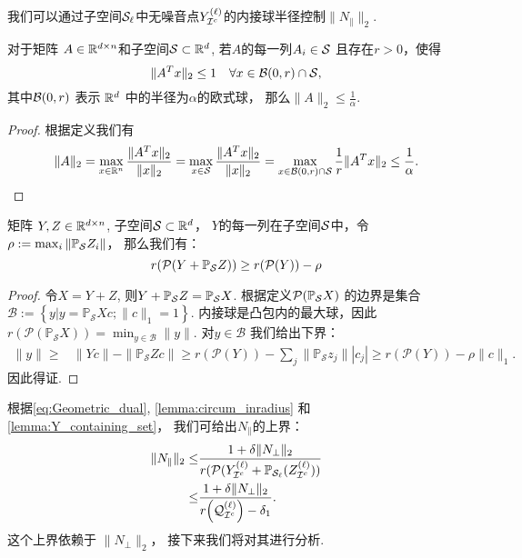 我们可以通过子空间\(\mathcal{S}_\ell\)中无噪音点\(Y^{(\ell)}_{\mathcal{I}^c}\)的内接球半径控制\(\|N_{\parallel}\|_2\).
\begin{lemma}\label{lemma:circum_inradius}
  对于矩阵 \(A \in \mathbb{R}^{d \times n}\)和子空间\(\mathcal{S}\subset \mathbb{R}^d\), 
  若\(A\)的每一列\(A_i \in \mathcal{S}\) 且存在\(r>0\)，使得
  \[\|A^Tx\|_2 \leq 1 \quad \forall x \in \mathcal{B}(0, r)\cap \mathcal{S},\]
  其中\(\mathcal{B}(0, r)\) 表示 \(\mathbb{R}^d\) 中的半径为\(\alpha\)的欧式球，
  那么\(\|A\|_2 \leq \frac{1}{\alpha}\).
\end{lemma}
\begin{proof}
  根据定义我们有
  \begin{align*}
    \|A\|_2 = \max_{x\in \mathbb{R}^n} \frac{\|A^Tx\|_2}{\|x\|_2}
    = \max_{x \in \mathcal{S}} \frac{\|A^Tx\|_2}{\|x\|_2}
    = \max_{x \in \mathcal{B}(0,r) \cap \mathcal{S}} \frac{1}{r} \|A^Tx\|_2
    \leq \frac{1}{\alpha}.
  \end{align*}
\end{proof}

\begin{lemma}\label{lemma:Y_containing_set}
  矩阵 \(Y, Z\in \mathbb{R}^{d \times n}\), 子空间\(\mathcal{S} \subset \mathbb{R}^d\)，
  \(Y\)的每一列在子空间\(\mathcal{S}\)中，令\(\rho:=\max_{i}\|\mathbb{P}_{\mathcal{S}} Z_i\|\)，
  那么我们有：
  \begin{equation*}
    r(\mathcal{P}(Y+\mathbb{P}_{\mathcal{S}} Z)) \geq r(\mathcal{P}(Y)) - \rho
  \end{equation*}
\end{lemma}
\begin{proof}
  令\(X=Y+Z\), 则\(Y+\mathbb{P}_{\mathcal{S}} Z=\mathbb{P}_{\mathcal{S}} X\). 根据定义\(\mathcal{P}(\mathbb{P}_{\mathcal{S}} X)\) 的边界是集合 \(\mathcal{B}:=
  \left\{y|y=\mathbb{P}_\mathcal{S} X c; \|c\|_1=1\right\}\).
  内接球是凸包内的最大球，因此 \(r(\mathcal{P}(\mathbb{P}_\mathcal{S} X)) =
  \min_{y\in \mathcal{B}} \|y\|\). 对\(y \in \mathcal{B} \) 我们给出下界：
  \begin{align*}
    \|y\| \geq& \|Yc\|-\|\mathbb{P}_\mathcal{S}Z c\|\geq r(\mathcal{P}(Y)) - {\sum}_j{\|\mathbb{P}_\mathcal{S}z_j}\||c_j|
    \geq r(\mathcal{P}(Y)) - \rho\|c\|_1.
  \end{align*}
  因此得证.
\end{proof}

根据\eqref{eq:Geometric_dual}, \autoref{lemma:circum_inradius} 和\autoref{lemma:Y_containing_set}，
我们可给出\(N_{\parallel}\)的上界：
\begin{align}
  \|N_{\parallel}\|_2 \leq& \frac{1+\delta\|N_{\perp}\|_2}
  {r(\mathcal{P}(Y_{\mathcal{I}^c}^{(\ell)}+\mathbb{P}_{\mathcal{S}_{\ell}}(Z_{\mathcal{I}^c}^{(\ell)}))}
  \nonumber \\
  \leq& \frac{1+\delta\|N_{\perp}\|_2}{r{\left( \mathcal{Q}_{\mathcal{I}^c}^{(\ell)}\right)}-\delta_1}.\label{eq:nu1_bound}
\end{align}
这个上界依赖于 \(\|N_{\perp}\|_2\)， 接下来我们将对其进行分析.

